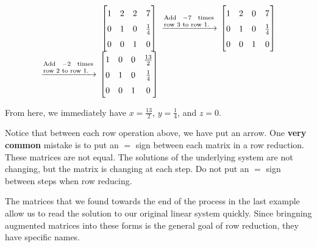 \begin{example}
	\[
		\setlength{\tabcolsep}{2pt}
		\renewcommand{\arraystretch}{1.5}
		\begin{tabular}{rccc}
			&
			$\begin{bmatrix}
				1 & 2 & 2 & 7\\
				0& 1 & 0 & \frac{1}{4}\\
				0 & 0 & 1 & 0
			\end{bmatrix}$
			&
			$\xrightarrow{\begin{minipage}{0.17\textwidth} \scriptsize Add $-7$ times row 3 to row 1.
			\end{minipage}}$
			&
			$\begin{bmatrix}
				1 & 2 & 0 & 7\\
				0& 1 & 0 & \frac{1}{4}\\
				0 & 0 & 1 & 0
			\end{bmatrix}$
			\\
			$\xrightarrow{\begin{minipage}{0.17\textwidth} \scriptsize Add $-2$ times row 2 to row 1.
			\end{minipage}}$
			&
			$\begin{bmatrix}
				1 & 0 & 0 & \frac{13}{2}\\
				0& 1 & 0 & \frac{1}{4}\\
				0 & 0 & 1 & 0
			\end{bmatrix}$
		\end{tabular}
	\]
	
	From here, we immediately have $x= \frac{13}{2}$, $y = \frac{1}{4}$, and $z = 0$.
\end{example}

\eject

\begin{remark}
	Notice that between each row operation above, we have put an arrow. One \textbf{very common} mistake is to put an $=$ sign between each matrix in a row reduction. These matrices are not equal. The solutions of the underlying system are not changing, but the matrix is changing at each step. Do not put an $=$ sign between steps when row reducing.
\end{remark}

The matrices that we found towards the end of the process in the last example allow us to read the solution to our original linear system quickly. Since bringning augmented matrices into these forms is the general goal of row reduction, they have specific names.


